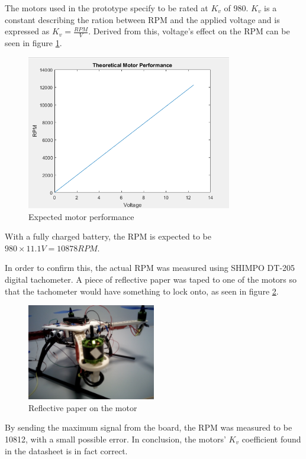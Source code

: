 The motors used in the prototype specify to be rated at $K_v$ of 980. $K_v$ is a constant describing the ration between RPM and the applied voltage and is expressed as $K_v = \frac{RPM}{V}$. Derived from this, voltage's effect on the RPM can be seen in figure \ref{KvPlot}.
\begin{figure}[H]
  \centering
    \includegraphics[width=0.8\textwidth]{images/KvPlot.png}
	\caption{Expected motor performance}
	\label{KvPlot}
\end{figure}
With a fully charged battery, the RPM is expected to be $980\times 11.1V = 10878 RPM$.

In order to confirm this, the actual RPM was measured using SHIMPO DT-205 digital tachometer. A piece of reflective paper was taped to one of the motors so that the tachometer would have something to lock onto, as seen in figure \ref{tachometer}.

\begin{figure}[H]
  \centering
    \includegraphics[width=0.5\textwidth]{images/tachometer.jpg}
	\caption{Reflective paper on the motor}
	\label{tachometer}
\end{figure}

By sending the maximum signal from the board, the RPM was measured to be 10812, with a small possible error.
In conclusion, the motors' $K_v$ coefficient found in the datasheet is in fact correct.

